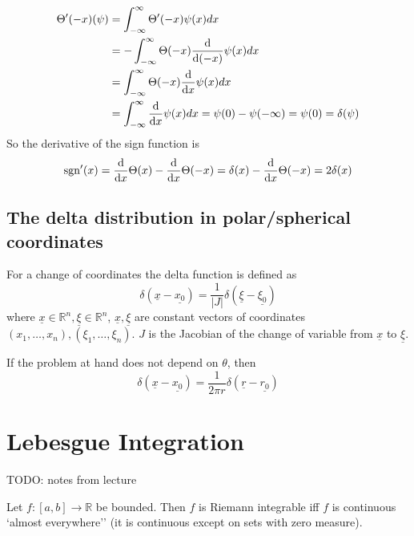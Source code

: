 \begin{example}
	\[
		\begin{aligned}
			\Theta'(-x) (\psi)
				& = \int_{-\infty}^{\infty} \Theta'(-x) \psi(x) dx \\
				& = -\int_{-\infty}^{\infty} \Theta(-x) \diff{}{(-x)} \psi(x) dx \\
				& = \int_{-\infty}^{\infty} \Theta(-x) \diff{}{x} \psi(x) dx \\
				& = \int_{-\infty}^{\infty} \diff{}{x} \psi(x) dx = \psi(0) - \psi(-\infty) = \psi(0) = \delta(\psi)
		\end{aligned}
	\]
	So the derivative of the sign function is
	\[
		\text{sgn}'(x) = \diff{}{x} \Theta(x) - \diff{}{x} \Theta(-x) = \delta(x) - \diff{}{x} \Theta(-x) = 2 \delta(x)
	\]
\end{example}

\subsection{The delta distribution in polar/spherical coordinates}

\begin{definition}
	For a change of coordinates the delta function is defined as
	\[
		\delta(\underline{x} - \underline{x_0}) = \frac{1}{|J|} \delta(\underline{\xi} - \underline{\xi_0})
	\]
	where $\underline{x} \in \mathbb{R}^n, \underline{\xi} \in \mathbb{R}^n$, $\underline{x}, \underline{\xi}$ are constant vectors of coordinates $(x_1, \dots, x_n), (\xi_1, \dots, \xi_n)$. $J$ is the Jacobian of the change of variable from $\underline{x}$ to $\underline{\xi}$.
\end{definition}

\begin{example}
	If the problem at hand does not depend on $\theta$, then
	\[
		\delta(\underline{x} - \underline{x_0}) = \frac{1}{2 \pi r} \delta(\underline{r} - \underline{r_0})
	\]
\end{example}

\section{Lebesgue Integration}

TODO: notes from lecture

\begin{theorem}
	Let $f: [a, b] \rightarrow \mathbb{R}$ be bounded. Then $f$ is Riemann integrable iff $f$ is continuous `almost everywhere'' (it is continuous except on sets with zero measure).
\end{theorem}

